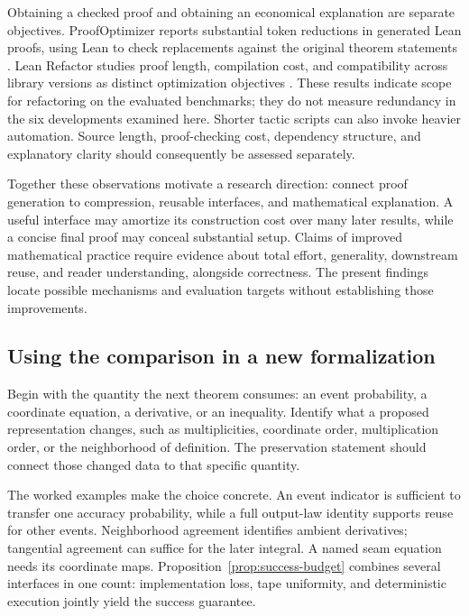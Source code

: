 Obtaining a checked proof and obtaining an economical explanation are
separate objectives. ProofOptimizer reports substantial token
reductions in generated Lean proofs, using Lean to check replacements
against the original theorem statements \citep{GuEtAl2025ProofOptimizer}. Lean Refactor studies proof
length, compilation cost, and compatibility across library versions as
distinct optimization objectives \citep{LuEtAl2026LeanRefactor}. These
results indicate scope for refactoring on the evaluated benchmarks;
they do not measure redundancy in the six
developments examined here. Shorter tactic scripts can also invoke
heavier automation. Source length, proof-checking cost, dependency
structure, and explanatory clarity should consequently be assessed
separately.

Together these observations motivate a research direction: connect
proof generation to compression, reusable interfaces, and mathematical
explanation. A useful interface may amortize its construction cost over
many later results, while a concise final proof may conceal substantial
setup. Claims of improved mathematical practice require evidence about
total effort, generality, downstream reuse, and reader understanding,
alongside correctness. The present findings locate possible mechanisms
and evaluation targets without establishing those improvements.

\subsection{Using the comparison in a new formalization}

Begin with the quantity the next theorem consumes: an event probability,
a coordinate equation, a derivative, or an inequality. Identify what a
proposed representation changes, such as multiplicities, coordinate
order, multiplication order, or the neighborhood of definition. The
preservation statement should connect those changed data to that
specific quantity.

The worked examples make the choice concrete. An event indicator is
sufficient to transfer one accuracy probability, while a full output-law
identity supports reuse for other events. Neighborhood agreement
identifies ambient derivatives; tangential agreement can suffice for the
later integral. A named seam equation needs its coordinate maps.
Proposition~\ref{prop:success-budget} combines several interfaces in one
count: implementation loss, tape uniformity, and deterministic execution
jointly yield the success guarantee.

